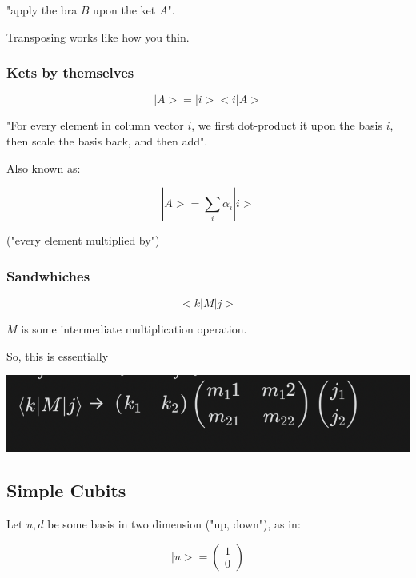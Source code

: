 \documentclass[letterpaper]{article}
\begin{document}
"apply the bra \(B\) upon the ket \(A\)".

Transposing works like how you thin.

\subsubsection{Kets by themselves}
\label{sec:org7ad0b62}
\begin{equation}
    |A\big> = |i\big> \big<i|A\big>
\end{equation}

"For every element in column vector \(i\), we first dot-product it upon the basis \(i\), then scale the basis back, and then add".

Also known as:

\begin{equation}
   |A\big> = \sum_i \alpha_i | i \big> 
\end{equation}

("every element multiplied by")

\subsubsection{Sandwhiches}
\label{sec:org86d923d}
\begin{equation}
   \big<k|M|j\big> 
\end{equation}

\(M\) is some intermediate multiplication operation.

So, this is essentially

\begin{center}
\includegraphics[width=.9\linewidth]{2022-02-01_09-08-14_screenshot.png}
\end{center}


\subsection{Simple Cubits}
\label{sec:orgf42dc43}
Let \(u,d\) be some basis in two dimension ("up, down"), as in:

\begin{equation}
    | u \big> = \begin{pmatrix} 1 \\ 0\end{pmatrix}
\end{equation}
\end{document}
